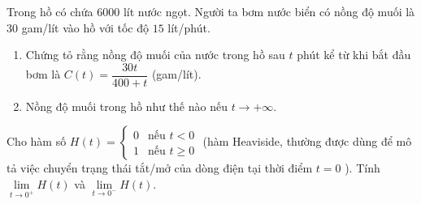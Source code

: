 \begin{bt}%
	Trong hồ có chứa $ 6000 $ lít nước ngọt. Người ta bơm nước biển có nồng độ muối là  $ 30 $ gam/lít vào hồ với tốc độ $ 15 $ lít/phút.
	\begin{enumerate}
		\item Chứng tỏ rằng nồng độ muối của nước trong hồ sau $ t $ phút kể từ khi bắt đầu bơm là  $ C(t)=\dfrac{30t}{400+t} $ (gam/lít).
		\item Nồng độ muối trong hồ như thế nào nếu $ t\to +\infty $.
	\end{enumerate}
\end{bt}

\begin{bt}%
	Cho hàm số $H(t)=\begin{cases}
		0 & \text{nếu }t<0\\ 
		1 & \text{nếu }t \geq 0
	\end{cases}$ (hàm Heaviside, thường được dùng để mô tả việc chuyển trạng thái tắt/mở của dòng điện tại thời điểm $t=0$ ). Tính $\lim \limits_{t \rightarrow 0^{+}} H(t)$ và $\lim \limits_{t \rightarrow 0^{-}} H(t)$.
\end{bt}

